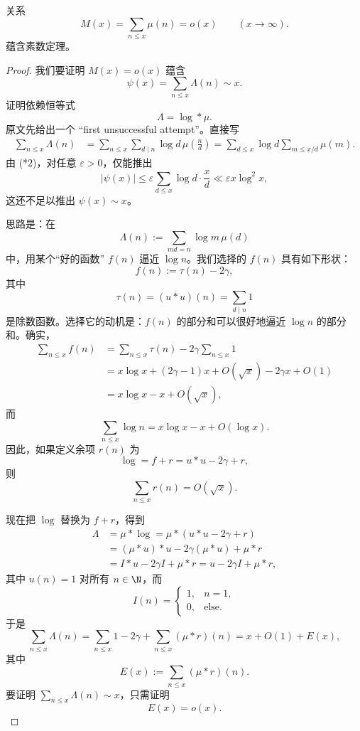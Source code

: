\begin{theorem}[原文 Theorem 3.19]
	关系
	\begin{equation}
		M(x)=\sum_{n\leq x}\mu(n)=o(x)\qquad (x\to\infty). \tag{*2}
	\end{equation}
	蕴含素数定理。
\end{theorem}

\begin{proof}
	我们要证明 $M(x)=o(x)$ 蕴含
	\[
		\psi(x)=\sum_{n\leq x}\Lambda(n)\sim x.
	\]
	证明依赖恒等式
	\[
		\Lambda=\log *\mu.
	\]
	原文先给出一个 “first unsuccessful attempt”。直接写
	\[
	\begin{aligned}
		\sum_{n\leq x}\Lambda(n)
		&=
		\sum_{n\leq x}\sum_{d\mid n}\log d\,\mu\left(\frac nd\right)
		=
		\sum_{d\leq x}\log d\sum_{m\leq x/d}\mu(m).
	\end{aligned}
	\]
	由 (*2)，对任意 $\varepsilon>0$，仅能推出
	\[
		|\psi(x)|
		\leq
		\varepsilon\sum_{d\leq x}\log d\cdot \frac xd
		\ll
		\varepsilon x\log^2 x,
	\]
	这还不足以推出 $\psi(x)\sim x$。

	思路是：在
	\[
		\Lambda(n):=\sum_{md=n}\log m\,\mu(d)
	\]
	中，用某个“好的函数” $f(n)$ 逼近 $\log n$。我们选择的 $f(n)$ 具有如下形状：
	\[
		f(n):=\tau(n)-2\gamma,
	\]
	其中
	\[
		\tau(n)=(u*u)(n)=\sum_{d\mid n}1
	\]
	是除数函数。选择它的动机是：$f(n)$ 的部分和可以很好地逼近 $\log n$ 的部分和。确实，
	\[
	\begin{aligned}
		\sum_{n\leq x}f(n)
		&=
		\sum_{n\leq x}\tau(n)-2\gamma\sum_{n\leq x}1\\
		&=
		x\log x+(2\gamma-1)x+O(\sqrt{x})
		-2\gamma x+O(1)\\
		&=
		x\log x-x+O(\sqrt{x}),
	\end{aligned}
	\]
	而
	\[
		\sum_{n\leq x}\log n
		=
		x\log x-x+O(\log x).
	\]
	因此，如果定义余项 $r(n)$ 为
	\[
		\log=f+r=u*u-2\gamma+r,
	\]
	则
	\begin{equation}
		\sum_{n\leq x}r(n)=O(\sqrt{x}). \tag{*3}
	\end{equation}

	现在把 $\log$ 替换为 $f+r$，得到
	\[
	\begin{aligned}
		\Lambda
		&=
		\mu*\log
		=
		\mu*(u*u-2\gamma+r)\\
		&=
		(\mu*u)*u-2\gamma(\mu*u)+\mu*r\\
		&=
		I*u-2\gamma I+\mu*r
		=
		u-2\gamma I+\mu*r,
	\end{aligned}
	\]
	其中 $u(n)=1$ 对所有 $n\in\N$，而
	\[
		I(n)=
		\begin{cases}
			1, & n=1,\\
			0, & \text{else}.
		\end{cases}
	\]
	于是
	\[
		\sum_{n\leq x}\Lambda(n)
		=
		\sum_{n\leq x}1-2\gamma+\sum_{n\leq x}(\mu*r)(n)
		=
		x+O(1)+E(x),
	\]
	其中
	\[
		E(x):=\sum_{n\leq x}(\mu*r)(n).
	\]
	要证明 $\sum_{n\leq x}\Lambda(n)\sim x$，只需证明
	\[
		E(x)=o(x).
	\]


\end{proof}
